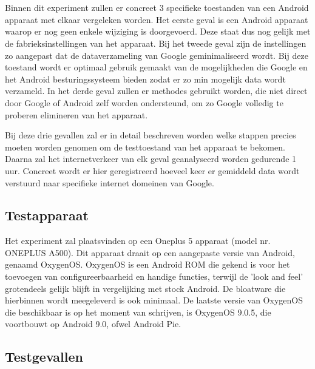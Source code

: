 
\chapter{}
\label{ch:methodologie}

Binnen dit experiment zullen er concreet 3 specifieke toestanden van een Android apparaat met elkaar vergeleken worden. Het eerste geval is een Android apparaat waarop er nog geen enkele wijziging is doorgevoerd. Deze staat dus nog gelijk met de fabrieksinstellingen van het apparaat. Bij het tweede geval zijn de instellingen zo aangepast dat de dataverzameling van Google geminimaliseerd wordt. Bij deze toestand wordt er optimaal gebruik gemaakt van de mogelijkheden die Google en het Android besturingssysteem bieden zodat er zo min mogelijk data wordt verzameld. In het derde geval zullen er methodes gebruikt worden, die niet direct door Google of Android zelf worden ondersteund, om zo Google volledig te proberen elimineren van het apparaat.

Bij deze drie gevallen zal er in detail beschreven worden welke stappen precies moeten worden genomen om de testtoestand van het apparaat te bekomen. Daarna zal het internetverkeer van elk geval geanalyseerd worden gedurende 1 uur. Concreet wordt er hier geregistreerd hoeveel keer er gemiddeld data wordt verstuurd naar specifieke internet domeinen van Google.

\section{Testapparaat}
\label{sec:testapparaat}
Het experiment zal plaatsvinden op een Oneplus 5 apparaat (model nr. ONEPLUS A500). Dit apparaat draait op een aangepaste versie van Android, genaamd OxygenOS. OxygenOS is een Android ROM die gekend is voor het toevoegen van configureerbaarheid en handige functies, terwijl de 'look and feel' grotendeels gelijk blijft in vergelijking met stock Android. De bloatware die hierbinnen wordt meegeleverd is ook minimaal. De laatste versie van OxygenOS die beschikbaar is op het moment van schrijven, is OxygenOS 9.0.5, die voortbouwt op Android 9.0, ofwel Android Pie.

\section{Testgevallen}
\label{sec:testgevallen}

